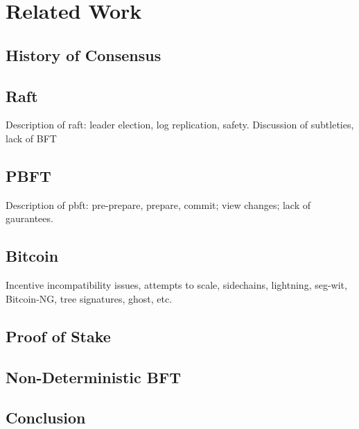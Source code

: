 \chapter{Related Work}
\label{ch:related}

\section{History of Consensus}

\section{Raft}

Description of raft: leader election, log replication, safety.
Discussion of subtleties, lack of BFT

\section{PBFT}

Description of pbft: pre-prepare, prepare, commit; view changes; lack of gaurantees.

\section{Bitcoin}

Incentive incompatibility issues, attempts to scale, sidechains, lightning, seg-wit, Bitcoin-NG,
tree signatures, ghost, etc.

\section{Proof of Stake}

\section{Non-Deterministic BFT}

\section{Conclusion}

